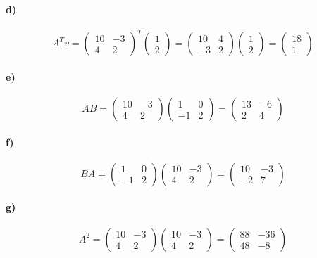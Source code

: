 \documentclass{article}
\begin{document}
\paragraph{d)}
\[A^Tv = \begin{pmatrix}10 & -3\\4&2\end{pmatrix}^T\begin{pmatrix}1\\2\end{pmatrix} = \begin{pmatrix}10 & 4\\-3&2\end{pmatrix}\begin{pmatrix}1\\2\end{pmatrix} = \begin{pmatrix}18\\1\end{pmatrix}\]
\paragraph{e)}
\[AB = \begin{pmatrix}10 & -3\\4&2\end{pmatrix}\begin{pmatrix}1 & 0\\-1&2\end{pmatrix} = \begin{pmatrix}13 & -6\\2&4\end{pmatrix}\]
\paragraph{f)}
\[BA = \begin{pmatrix}1 & 0\\-1&2\end{pmatrix}\begin{pmatrix}10 & -3\\4&2\end{pmatrix} = \begin{pmatrix}10 & -3\\-2&7\end{pmatrix}\]
\paragraph{g)}
\[A^2 = \begin{pmatrix}10 & -3\\4&2\end{pmatrix}\begin{pmatrix}10 & -3\\4&2\end{pmatrix} = \begin{pmatrix}88& -36\\48&-8\end{pmatrix}\]
\end{document}
